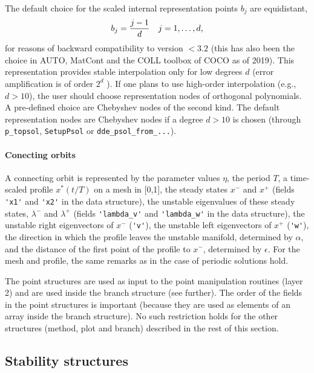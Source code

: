 \documentclass[10pt]{scrartcl}
\newcommand{\blist}[1]{\mbox{\lstinline!#1!}}
\begin{document}
The default choice for the scaled internal representation points $b_j$ are equidistant,
\begin{displaymath}
  b_j=\frac{j-1}{d}\mbox{\quad $j=1,\ldots,d$,}
\end{displaymath}
for reasons of backward compatibility to version $<3.2$ (this has also
been the choice in AUTO, MatCont and the COLL toolbox of \textsc{COCO}
as of 2019). This representation provides stable interpolation only
for low degrees $d$ (error amplification is of order $2^d$
\cite{berrut2004}). If one plans to use high-order interpolation
(e.g., $d>10$), the user should choose representation nodes of
orthogonal polynomials. A pre-defined choice are Chebyshev nodes of
the second kind. The default representation nodes are Chebyshev nodes
if a degree $d>10$ is chosen (through \blist{p_topsol},
\blist{SetupPsol} or \blist{dde_psol_from_...}).


\paragraph{Conecting orbits}
A connecting orbit is represented by the parameter values $\eta$, the
period $T$, a time-scaled profile $x^*(t/T)$ on a mesh in [0,1], the
steady states $x^-$ and $x^+$ (fields \blist{'x1'} and \blist{'x2'} in
the data structure), the unstable eigenvalues of these steady states,
$\lambda^-$ and $\lambda^+$ (fields \blist{'lambda_v'} and
\blist{'lambda_w'} in the data structure), the unstable right
eigenvectors of $x^-$ (\blist{'v'}), the unstable left eigenvectors of
$x^+$ (\blist{'w'}), the direction in which the profile leaves the unstable
manifold, determined by $\alpha$, and the distance of the first point
of the profile to $x^-$, determined by $\epsilon$.  For the mesh and
profile, the same remarks as in the case of periodic solutions hold.

The point structures are used as input to the point
manipulation routines (layer 2) and are used inside
the branch structure (see further). The order of the fields in the point 
structures is important (because they are used as elements
of an array inside the branch structure).
No such restriction holds for the other structures (method, plot and
branch) described in the rest of this section.

\subsection{Stability structures}\label{sec:stab:struct}
\end{document}
